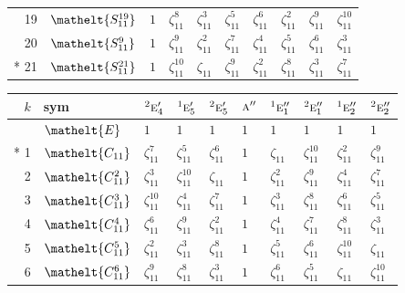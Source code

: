 \documentclass[10pt,a4paper]{article}
\numberwithin{equation}{section}
\newcommand{\eltfont}[1]{{\let\sigma\eltsigma\mathelt{#1}}}
\newcommand{\irr}[1]{\text{\normalfont\scshape #1}}
\newcommand{\conjpair}[1]{{}^{#1}}
\newcommand{\cls}[1]{\eltfont{#1}}
\newcommand{\rootunity}[1]{\zeta_{#1}}
\begin{document}
{\begin{longtable}{@{}rlllllllll@{}}
19 & $\cls{S_{11}^{19}}$ & $1$ & $\rootunity{11}^{8}$ & $\rootunity{11}^{3}$ & $\rootunity{11}^{5}$ & $\rootunity{11}^{6}$ & $\rootunity{11}^{2}$ & $\rootunity{11}^{9}$ & $\rootunity{11}^{10}$\\
20 & $\cls{S_{11}^{9}}$ & $1$ & $\rootunity{11}^{9}$ & $\rootunity{11}^{2}$ & $\rootunity{11}^{7}$ & $\rootunity{11}^{4}$ & $\rootunity{11}^{5}$ & $\rootunity{11}^{6}$ & $\rootunity{11}^{3}$\\*
21 & $\cls{S_{11}^{21}}$ & $1$ & $\rootunity{11}^{10}$ & $\rootunity{11}$ & $\rootunity{11}^{9}$ & $\rootunity{11}^{2}$ & $\rootunity{11}^{8}$ & $\rootunity{11}^{3}$ & $\rootunity{11}^{7}$\\
\bottomrule\end{longtable}}
{\small\setlength{\tabcolsep}{4pt}
\begin{longtable}{@{}rlllllllll@{}}\toprule
$k$ & sym & $\conjpair{2}\irr{e}_{4}'$ & $\conjpair{1}\irr{e}_{5}'$ & $\conjpair{2}\irr{e}_{5}'$ & $\irr{a}''$ & $\conjpair{1}\irr{e}_{1}''$ & $\conjpair{2}\irr{e}_{1}''$ & $\conjpair{1}\irr{e}_{2}''$ & $\conjpair{2}\irr{e}_{2}''$\\\midrule\endhead
\bottomrule\endfoot\endlastfoot
0 & $\cls{E}$ & $1$ & $1$ & $1$ & $1$ & $1$ & $1$ & $1$ & $1$\\*
1 & $\cls{C_{11}}$ & $\rootunity{11}^{7}$ & $\rootunity{11}^{5}$ & $\rootunity{11}^{6}$ & $1$ & $\rootunity{11}$ & $\rootunity{11}^{10}$ & $\rootunity{11}^{2}$ & $\rootunity{11}^{9}$\\
2 & $\cls{C_{11}^{2}}$ & $\rootunity{11}^{3}$ & $\rootunity{11}^{10}$ & $\rootunity{11}$ & $1$ & $\rootunity{11}^{2}$ & $\rootunity{11}^{9}$ & $\rootunity{11}^{4}$ & $\rootunity{11}^{7}$\\
3 & $\cls{C_{11}^{3}}$ & $\rootunity{11}^{10}$ & $\rootunity{11}^{4}$ & $\rootunity{11}^{7}$ & $1$ & $\rootunity{11}^{3}$ & $\rootunity{11}^{8}$ & $\rootunity{11}^{6}$ & $\rootunity{11}^{5}$\\
4 & $\cls{C_{11}^{4}}$ & $\rootunity{11}^{6}$ & $\rootunity{11}^{9}$ & $\rootunity{11}^{2}$ & $1$ & $\rootunity{11}^{4}$ & $\rootunity{11}^{7}$ & $\rootunity{11}^{8}$ & $\rootunity{11}^{3}$\\
5 & $\cls{C_{11}^{5}}$ & $\rootunity{11}^{2}$ & $\rootunity{11}^{3}$ & $\rootunity{11}^{8}$ & $1$ & $\rootunity{11}^{5}$ & $\rootunity{11}^{6}$ & $\rootunity{11}^{10}$ & $\rootunity{11}$\\
6 & $\cls{C_{11}^{6}}$ & $\rootunity{11}^{9}$ & $\rootunity{11}^{8}$ & $\rootunity{11}^{3}$ & $1$ & $\rootunity{11}^{6}$ & $\rootunity{11}^{5}$ & $\rootunity{11}$ & $\rootunity{11}^{10}$\\

\end{longtable}}
\end{document}
